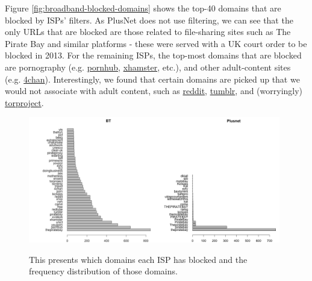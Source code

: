 \documentclass{bmcart}
\begin{document}
Figure \ref{fig:broadband-blocked-domains} shows the top-40 domains that are blocked by ISPs' filters. 
As PlusNet does not use filtering, we can see that the only URLs that are blocked are those related to file-sharing sites such as The Pirate Bay and similar platforms - these were served with a UK court order to be blocked in 2013.
For the remaining ISPs, the top-most domains that are blocked are pornography (e.g. \url{pornhub}, \url{xhamster}, etc.), and other adult-content sites (e.g. \url{4chan}).
Interestingly, we found that certain domains are picked up that we would not associate with adult content, such as \url{reddit}, \url{tumblr}, and (worryingly) \url{torproject}.

\begin{figure}[h!]
\caption{ This presents which domains each ISP has blocked and the frequency distribution of those domains.}
\includegraphics[width=0.49\textwidth]{imgs/BT-blocked-pages-to-date}\includegraphics[width=0.49\textwidth]{imgs/Plusnet-blocked-pages-to-date}

\end{figure}
\end{document}
